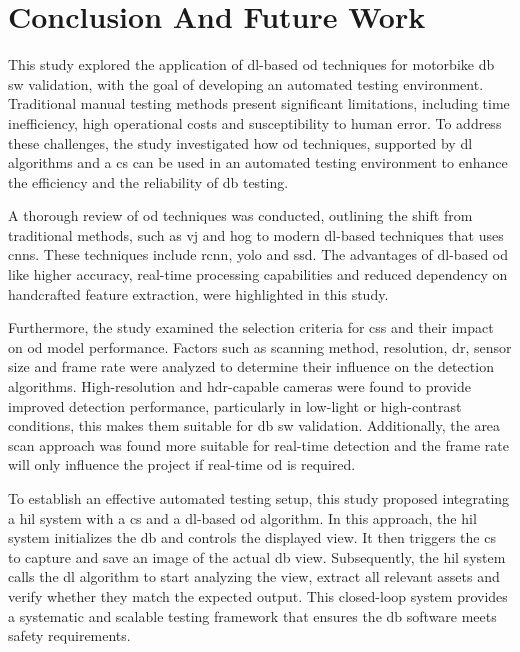 \chapter{Conclusion And Future Work}

This study explored the application of \gls{dl}-based \gls{od} techniques for motorbike \gls{db} \gls{sw} validation, with the goal of developing an automated testing environment. Traditional manual testing methods present significant limitations, including time inefficiency, high operational costs and susceptibility to human error. To address these challenges, the study investigated how \gls{od} techniques, supported by \gls{dl} algorithms and a \gls{cs} can be used in an automated testing environment to enhance the efficiency and the reliability of \gls{db} testing.

A thorough review of \gls{od} techniques was conducted, outlining the shift from traditional methods, such as \gls{vj} and \gls{hog} to modern \gls{dl}-based techniques that uses \gls{cnn}s. These techniques include \gls{rcnn}, \gls{yolo} and \gls{ssd}. The advantages of \gls{dl}-based \gls{od} like higher accuracy, real-time processing capabilities and reduced dependency on handcrafted feature extraction, were highlighted in this study.

Furthermore, the study examined the selection criteria for \gls{cs}s and their impact on \gls{od} model performance. Factors such as scanning method, resolution, \gls{dr}, sensor size and frame rate were analyzed to determine their influence on the detection algorithms. High-resolution and \gls{hdr}-capable cameras were found to provide improved detection performance, particularly in low-light or high-contrast conditions, this makes them suitable for \gls{db} \gls{sw} validation. Additionally, the area scan approach was found more suitable for real-time detection and the frame rate will only influence the project if real-time \gls{od} is required.

To establish an effective automated testing setup, this study proposed integrating a \gls{hil} system with a \gls{cs} and a \gls{dl}-based \gls{od} algorithm. In this approach, the \gls{hil} system initializes the \gls{db} and controls the displayed view. It then triggers the \gls{cs} to capture and save an image of the actual \gls{db} view. Subsequently, the \gls{hil} system calls the \gls{dl} algorithm to start analyzing the view, extract all relevant assets and verify whether they match the expected output. This closed-loop system provides a systematic and scalable testing framework that ensures the \gls{db} software meets safety requirements.

